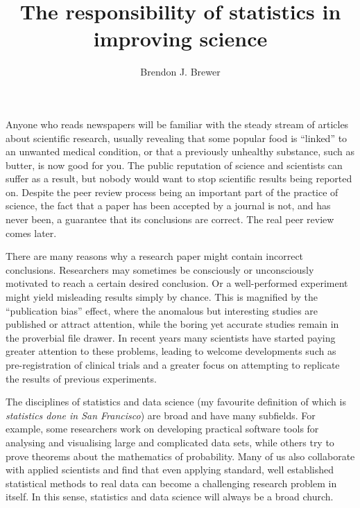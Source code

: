 \documentclass[a4paper, 12pt]{article}
\title{The responsibility of statistics in improving science}
\author{Brendon J. Brewer}
\begin{document}
\sffamily
\maketitle

Anyone who reads newspapers will be familiar with the steady stream of
articles about scientific research, usually revealing that some popular food
is ``linked'' to an unwanted medical condition,
or that a previously unhealthy substance, such as butter, is now
good for you. The public reputation of science and scientists can suffer as
a result, but nobody would want to stop scientific results being reported on.
Despite the peer review process being an important part of the practice of
science, the fact that a paper has been accepted by a journal
is not, and has never been, a guarantee that its conclusions are correct.
The real peer review comes later.

There are many reasons why a research paper might contain incorrect conclusions. Researchers may sometimes be consciously or
unconsciously motivated to reach a certain desired conclusion.
Or a well-performed experiment might yield
misleading results simply by chance. This is magnified by the
``publication bias'' effect, where the anomalous but interesting studies
are published or attract attention, while the boring yet accurate studies
remain in the proverbial file drawer. In recent years many scientists have
started paying greater attention to these problems, leading to welcome
developments such as pre-registration of clinical trials and
a greater focus on attempting to replicate the results of previous
experiments.



The disciplines of statistics and data science
(my favourite definition of which is {\em statistics done in San Francisco})
are broad and have many subfields. For example, some researchers
work on developing practical software tools for analysing and visualising large and
complicated data sets, while others try to prove theorems about the mathematics
of probability. Many of us also collaborate with applied scientists and find
that even applying standard, well established statistical methods to
real data can become a challenging research problem in itself. In this sense,
statistics and data science will always be a broad church.
\end{document}

